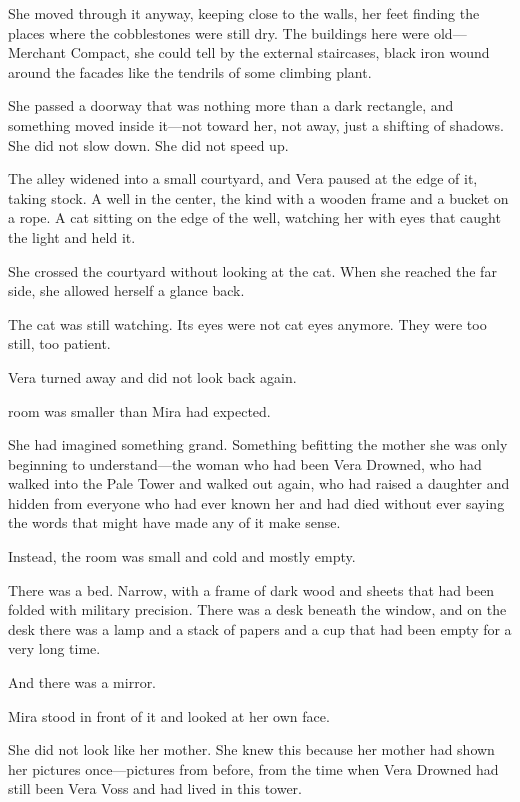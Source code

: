 \documentclass[12pt,letterpaper,openany]{book}
\begin{document}
\par
She moved through it anyway, keeping close to the walls, her feet finding the places where the cobblestones were still dry. The buildings here were old—Merchant Compact, she could tell by the external staircases, black iron wound around the facades like the tendrils of some climbing plant.
\par
She passed a doorway that was nothing more than a dark rectangle, and something moved inside it—not toward her, not away, just a shifting of shadows. She did not slow down. She did not speed up.
\par
The alley widened into a small courtyard, and Vera paused at the edge of it, taking stock. A well in the center, the kind with a wooden frame and a bucket on a rope. A cat sitting on the edge of the well, watching her with eyes that caught the light and held it.
\par
She crossed the courtyard without looking at the cat. When she reached the far side, she allowed herself a glance back.
\par
The cat was still watching. Its eyes were not cat eyes anymore. They were too still, too patient.
\par
Vera turned away and did not look back again.
\par
\hrulefillThe room was smaller than Mira had expected.
\par
She had imagined something grand. Something befitting the mother she was only beginning to understand—the woman who had been Vera Drowned, who had walked into the Pale Tower and walked out again, who had raised a daughter and hidden from everyone who had ever known her and had died without ever saying the words that might have made any of it make sense.
\par
Instead, the room was small and cold and mostly empty.
\par
There was a bed. Narrow, with a frame of dark wood and sheets that had been folded with military precision. There was a desk beneath the window, and on the desk there was a lamp and a stack of papers and a cup that had been empty for a very long time.
\par
And there was a mirror.
\par
Mira stood in front of it and looked at her own face.
\par
She did not look like her mother. She knew this because her mother had shown her pictures once—pictures from before, from the time when Vera Drowned had still been Vera Voss and had lived in this tower.
\par
\end{document}
